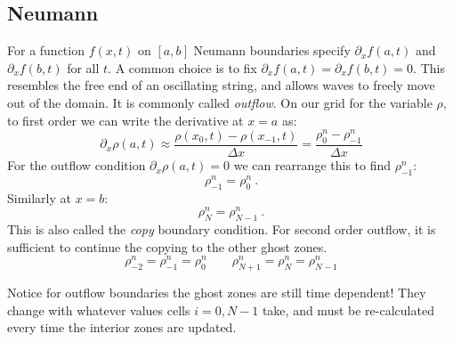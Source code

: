\documentclass{article}
\begin{document}
\subsection{Neumann}

For a function $f(x,t)$ on $[a,b]$ Neumann boundaries specify $\partial_x f(a,t)$ and $\partial_x f(b,t)$ for all $t$. A common choice is to fix $\partial_x f(a,t) = \partial_x f(b,t) = 0$.  This resembles the free end of an oscillating string, and allows waves to freely move out of the domain. It is commonly called \emph{outflow}.  On our grid for the variable $\rho$, to first order we can write the derivative at $x=a$ as:
\begin{equation}
	\partial_x \rho(a,t) \approx \frac{\rho(x_0,t) - \rho(x_{-1},t)}{\Delta x} = \frac{\rho_0^n - \rho_{-1}^n}{\Delta x}
\end{equation}
For the outflow condition $\partial_x \rho(a,t)=0$ we can rearrange this to find $\rho_{-1}^n$:
\begin{equation}
	\rho_{-1}^n = \rho_{0}^n\ .
\end{equation}
Similarly at $x=b$:
\begin{equation}
	\rho_{N}^n = \rho_{N-1}^n\ .
\end{equation}
This is also called the \emph{copy} boundary condition.  For second order outflow, it is sufficient to continue the copying to the other ghost zones.
\begin{equation}
	\rho_{-2}^n = \rho_{-1}^n = \rho_{0}^n\qquad \rho_{N+1}^n = \rho_{N}^n = \rho_{N-1}^n
\end{equation}

Notice for outflow boundaries the ghost zones are still time dependent!  They change with whatever values cells $i=0,N-1$ take, and must be re-calculated every time the interior zones are updated.
\end{document}
